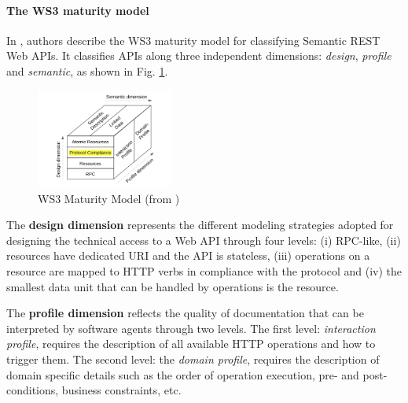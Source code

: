 \paragraph{The WS3 maturity model}

In \cite{7195633}, authors describe the WS3 maturity model for classifying Semantic REST Web APIs. 
It classifies APIs along three independent dimensions: \textit{design}, \textit{profile} and \textit{semantic}, as shown in Fig. \ref{WS3}.

\begin{figure}
\vspace{-0.9cm}
\caption{ WS3 Maturity Model (from \cite{7195633})}
  \begin{center}
    \includegraphics[width=0.4\textwidth]{figures/ws3-maturity-model.png}
  \end{center}
  \label{WS3}
  \vspace{-0.9cm}
\end{figure}

The \textbf{design dimension} represents the different modeling strategies adopted for designing the technical access to a Web API through four levels:
(i) RPC-like, (ii) resources have dedicated URI and the API is stateless, (iii) operations on a resource are mapped to HTTP verbs in compliance with the protocol and (iv) the smallest data unit that can be handled by operations is the resource.

The \textbf{profile dimension} reflects the quality of documentation that can be interpreted by software agents through two levels. The first level: \textit{interaction profile}, requires the description of all available HTTP operations and how to trigger them. The second level: the \textit{domain profile}, requires the description of domain specific details such as the order of operation execution, pre- and post-conditions, business constraints, etc.

